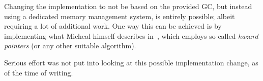 Changing the implementation to not be based on the provided GC, but instead using a dedicated memory management system, is entirely possible; albeit requiring a lot of additional work.
One way this can be achieved is by implementing what Micheal himself describes in~\cite{micheal-safe-reclamation}, which employs so-called \emph{hazard pointers} (or any other suitable algorithm).

Serious effort was not put into looking at this possible implementation change, as of the time of writing.
